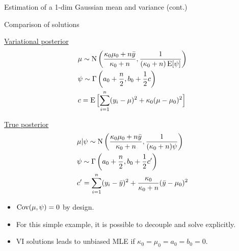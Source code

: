 \begin{frame}{Estimation of a 1-dim Gaussian mean and variance (cont.)}
\end{frame}

\begin{frame}{Comparison of solutions}
  
  {\centering
  \begin{minipage}{0.45\linewidth}
    \underline{Variational posterior}
    {\small
    \begin{align*}
      &\mu \sim \N \left(\frac{\kappa_0 \mu_0 + n\bar y}{\kappa_0 + n}, \frac{1}{(\kappa_0 + n)\E[\psi]} \right) \\
      &\psi \sim \Gamma\left(a_0 + \half[n], b_0 + \half c\right) \\
      &c = \E\Big[ {\sum_{i=1}^n} (y_i - \mu)^2 + \kappa_0(\mu - \mu_0)^2 \Big]
    \end{align*}}
  \end{minipage}
  \hspace{6mm}
  \begin{minipage}{0.45\linewidth}
    \underline{True posterior}
    {\small
    \begin{align*}
      &\mu|\psi \sim \N \left(\frac{\kappa_0 \mu_0 + n\bar y}{\kappa_0 + n}, \frac{1}{(\kappa_0 + n)\psi} \right) \\
      &\psi \sim \Gamma\left(a_0 + \half[n], b_0 + \half c' \right) \\
      &c' = {\sum_{i=1}^n} (y_i - \bar y)^2 + \frac{\kappa_0}{\kappa_0 + n}(\bar y - \mu_0)^2
    \end{align*}}    
  \end{minipage}}
  
  \begin{itemize}
    \item $\Cov(\mu,\psi) = 0$ by design.
    \item For this simple example, it is possible to decouple and solve explicitly.
    \item VI solutions leads to unbiased MLE if $\kappa_0 = \mu_0 = a_0 = b_0 = 0$.
  \end{itemize}
\end{frame}



